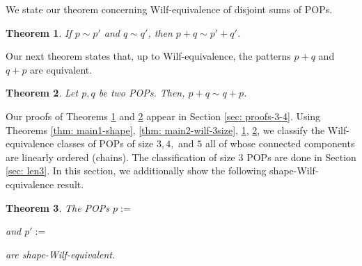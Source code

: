 \documentclass[12pt, english, a4paper]{article}
\theoremstyle{plain}
\newtheorem{theorem}{Theorem}
\theoremstyle{definition}
\theoremstyle{remark}
\begin{document}
We state our theorem concerning Wilf-equivalence of disjoint sums of POPs.

\begin{theorem}\label{thm: disjoint-sum-shape-w}
    If $p\sim p'$ and $q\sim q'$, then $p+q\sim p'+q'$.
\end{theorem}

Our next theorem states that, up to Wilf-equivalence, the patterns $p+q$ and $q+p$ are equivalent.

\begin{theorem}\label{thm: disjoint-sum-wilf}
    Let $p, q$ be two POPs. Then, $p+q\sim q+p$.
\end{theorem}



Our proofs of Theorems \ref{thm: disjoint-sum-shape-w} and \ref{thm: disjoint-sum-wilf} appear in Section \ref{sec: proofs-3-4}.
Using Theorems \ref{thm: main1-shape}, \ref{thm: main2-wilf-3size}, \ref{thm: disjoint-sum-shape-w}, \ref{thm: disjoint-sum-wilf}, we classify the Wilf-equivalence classes of POPs of size $3,4,$ and $5$ all of whose connected components are linearly ordered (chains). The classification of size $3$ POPs are done in Section \ref{sec: len3}. In this section, we additionally show the following shape-Wilf-equivalence result.
\begin{theorem}\label{thm: len3-B12-B21}
    The POPs $p:=$
and $p':=$ are shape-Wilf-equivalent.
\end{theorem}
\end{document}
